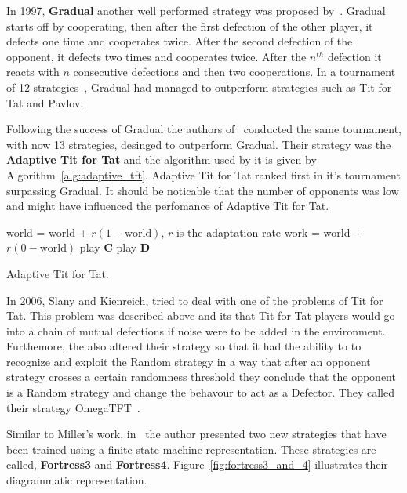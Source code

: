 \documentclass{article}
\theoremstyle{definition}
\begin{document}

In 1997, \textbf{Gradual} another well performed strategy
was proposed by~\cite{Beaufils1997}. Gradual starts off by cooperating,
then after the first defection of the other player, it defects one time and cooperates
twice. After the second defection of the opponent, it defects two times and cooperates
twice. After the \(n^{th}\) defection it reacts with \(n\) consecutive defections 
and then two cooperations. In a tournament of 12 strategies~\cite{Beaufils1997},
Gradual had managed to outperform strategies such as Tit for Tat and Pavlov.

Following the success of Gradual the authors of~\cite{tzafestas-2000a} conducted
the same tournament, with now 13 strategies, desinged to outperform Gradual. Their strategy
was the \textbf{Adaptive Tit for Tat} and the algorithm used by it is given by
Algorithm~\ref{alg:adaptive_tft}. Adaptive Tit for Tat ranked first in it's tournament
surpassing Gradual. It should be noticable that the number of opponents was low
and might have influenced the perfomance of Adaptive Tit for Tat.

\begin{algorithm}
\begin{algorithmic}
     \STATE world = world + \(r(1-\text{world})\), \(r\) is the adaptation rate
    \ELSE
     \STATE work = world + \(r(0 - \text{world})\)
     \ENDIF
        \STATE play \textbf{C}
    \ELSE
    \STATE play \textbf{D}
    \ENDIF
\end{algorithmic}
\caption{Adaptive Tit for Tat.}
\label{alg:adaptive_tft}
\end{algorithm}

In 2006, Slany and Kienreich, tried to deal with one of the problems of Tit for Tat.
This problem was described above and its that Tit for Tat players would go into
a chain of mutual defections if noise were to be added in the environment.
Furthemore, the also altered their strategy so that it had the ability to
to recognize and exploit the Random strategy in a way that after an opponent
strategy crosses a certain randomness threshold they conclude that the opponent is
a Random strategy and change the behavour to act as a Defector.
They called their strategy OmegaTFT~\cite{Wolfgang2006}.

Similar to Miller's work, in~\cite{Ashlock2006b} the author presented two new
strategies that have been trained using a finite state machine representation.
These strategies are called,
\textbf{Fortress3} and \textbf{Fortress4}. Figure~\ref{fig:fortress3_and_4}
illustrates their diagrammatic representation.
\end{document}
